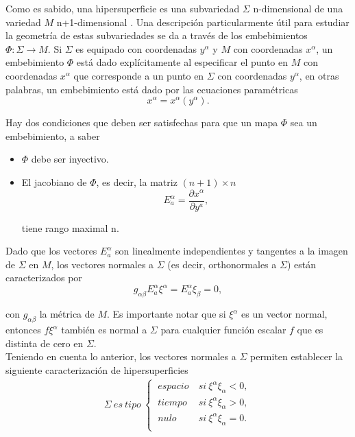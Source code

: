 \documentclass{article}
\numberwithin{equation}{section}
\theoremstyle{definition}
\begin{document}
Como es sabido, una hipersuperficie es una subvariedad $\Sigma$ n-dimensional de una variedad $M$ n+1-dimensional \cite{blau}. Una descripción particularmente útil para estudiar la geometría de estas subvariedades se da a través de los embebimientos $\Phi: \Sigma \to M$. Si $\Sigma$ es equipado con coordenadas $y^\alpha$ y $M$ con coordenadas $x^\alpha$, un embebimiento $\Phi$ está dado explícitamente al especificar el punto en $M$ con coordenadas $x^\alpha$ que corresponde a un punto en $\Sigma$ con coordenadas $y^\alpha$, en otras palabras, un embebimiento está dado por las ecuaciones paramétricas 
\begin{equation*}
x^\alpha = x^\alpha(y^\alpha).
\end{equation*}

Hay dos condiciones que deben ser satisfechas para que un mapa $\Phi$ sea un embebimiento, a saber
\begin{itemize}
	\item $\Phi$ debe ser inyectivo.
	\item El jacobiano de $\Phi$, es decir, la matriz $(n+1)\times n$
	\begin{equation*}
	E^{\alpha}_{a} = \frac{\partial x^\alpha}{\partial y^a},
	\end{equation*}
	
	tiene rango maximal n.
\end{itemize}

Dado que los vectores $E^{\alpha}_{a}$ son linealmente independientes y tangentes a la imagen de $\Sigma$ en $M$, los vectores normales a $\Sigma$ (es decir, orthonormales a $\Sigma$) están caracterizados por 
\begin{equation*}
g_{\alpha \beta}E^{\alpha}_{a}\xi^{\alpha} = E^{\alpha}_{a}\xi_{\beta} = 0,
\end{equation*}

con $g_{\alpha \beta}$ la métrica de $M$. Es importante notar que si $\xi^{\alpha}$ es un vector normal, entonces $f\xi^{\alpha}$ también es normal a $\Sigma$ para cualquier función escalar $f$ que es distinta de cero en $\Sigma$.\\

Teniendo en cuenta lo anterior, los vectores normales a $\Sigma$ permiten establecer la siguiente caracterización de hipersuperficies
\begin{align*}
\Sigma\ es\ tipo\  
\begin{cases}
\ espacio\ & si\ \xi^{\alpha}\xi_{\alpha}<0,\\
\ tiempo\ & si\ \xi^{\alpha}\xi_{\alpha}>0,\\
\ nulo\ & si\ \xi^{\alpha}\xi_{\alpha}=0.\\
\end{cases}
\end{align*}
\end{document}
